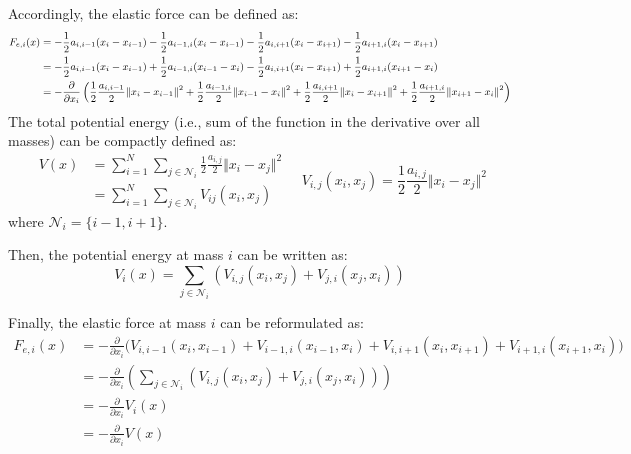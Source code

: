 \begin{description}
        Accordingly, the elastic force can be defined as:
        \[
            \small
            \begin{split}
                F_{e,i}(x) 
                &= 
                    - \frac{1}{2} a_{i,i-1}(x_i - x_{i-1}) 
                    - \frac{1}{2} a_{i-1,i}(x_i - x_{i-1}) 
                    - \frac{1}{2} a_{i,i+1}(x_i - x_{i+1}) 
                    - \frac{1}{2} a_{i+1,i}(x_i - x_{i+1}) \\
                &= 
                    - \frac{1}{2} a_{i,i-1}(x_i - x_{i-1}) 
                    + \frac{1}{2} a_{i-1,i}(x_{i-1} - x_i) 
                    - \frac{1}{2} a_{i,i+1}(x_i - x_{i+1}) 
                    + \frac{1}{2} a_{i+1,i}(x_{i+1} - x_i) \\
                &= -\frac{\partial}{\partial x_i} \left( 
                    \frac{1}{2} \frac{a_{i,i-1}}{2} \Vert x_i - x_{i-1} \Vert^2 + 
                    \frac{1}{2} \frac{a_{i-1,i}}{2} \Vert x_{i-1} - x_{i} \Vert^2 + 
                    \frac{1}{2} \frac{a_{i,i+1}}{2} \Vert x_i - x_{i+1} \Vert^2 + 
                    \frac{1}{2} \frac{a_{i+1,i}}{2} \Vert x_{i+1} - x_{i} \Vert^2 \right)
            \end{split}
        \]
        The total potential energy (i.e., sum of the function in the derivative over all masses) can be compactly defined as:
        \[
            \begin{split}
                V(x) &= \sum_{i=1}^{N} \sum_{j \in \mathcal{N}_i} \frac{1}{2} \frac{a_{i,j}}{2} \Vert x_i - x_j \Vert^2 \\
                &= \sum_{i=1}^{N} \sum_{j \in \mathcal{N}_i} V_{ij}(x_i, x_j)
            \end{split}
            \quad
            V_{i,j}(x_i, x_j) = \frac{1}{2} \frac{a_{i,j}}{2} \Vert x_i - x_j \Vert^2
        \]
        where $\mathcal{N}_i = \{ i-1, i+1 \}$.

        Then, the potential energy at mass $i$ can be written as:
        \[
            V_i(x) = \sum_{j \in \mathcal{N}_i} ( V_{i,j}(x_i, x_j) + V_{j,i}(x_j, x_i) )
        \]
            
        Finally, the elastic force at mass $i$ can be reformulated as:
        \[
            \begin{split}
                F_{e,i}(x) 
                &= - \frac{\partial}{\partial x_i} \Big( V_{i,i-1}(x_i, x_{i-1}) + V_{i-1,i}(x_{i-1}, x_i) + V_{i,i+1}(x_i, x_{i+1}) + V_{i+1,i}(x_{i+1}, x_i) \Big) \\
                &= - \frac{\partial}{\partial x_i} \left( \sum_{j \in \mathcal{N}_i} ( V_{i,j}(x_i, x_j) + V_{j,i}(x_j, x_i) ) \right) \\
                &= - \frac{\partial}{\partial x_i} V_i(x) \\
                &= - \frac{\partial}{\partial x_i} V(x)
            \end{split}
        \]


\end{description}
